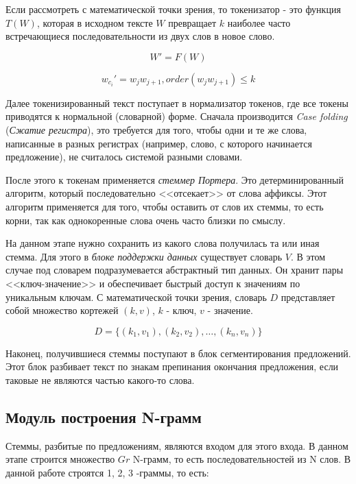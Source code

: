 \documentclass[a4paper,12pt,preview]{report} %
\begin{document}
	Если рассмотреть с математической точки зрения, то токенизатор - это функция $T(W)$, которая в исходном тексте $W$ превращает $k$ наиболее часто встречающиеся последовательности из двух слов в новое слово.
	
	\begin{equation}
	W' = F(W)
	\end{equation}
	
	\begin{equation}
	w_{c_i}' = w_jw_{j+1}, order(w_jw_{j+1}) \leq k 
	\end{equation}
	
	Далее токенизированный текст поступает в нормализатор токенов, где все токены приводятся к нормальной (словарной) форме. Сначала производится \textit{Case folding} (\textit{Сжатие регистра}), это требуется для того, чтобы одни и те же слова, написанные в разных регистрах (например, слово, с которого начинается предложение), не считалось системой разными словами. 
	
	После этого к токенам применяется \textit{стеммер Портера}. Это детерминированный алгоритм, который последовательно <<отсекает>> от слова аффиксы. Этот алгоритм применяется для того, чтобы оставить от слов их стеммы, то есть корни, так как однокоренные слова очень часто близки по смыслу.
	
	На данном этапе нужно сохранить из какого слова получилась та или иная стемма. Для этого в \textit{блоке поддержки данных} существует словарь $V$. В этом случае под словарем подразумевается абстрактный тип данных. Он хранит пары <<ключ-значение>> и обеспечивает быстрый доступ к значениям по уникальным ключам. С математической точки зрения, словарь $D$ представляет собой множество кортежей $(k, v)$, $k$ - ключ, $v$ - значение.
	
	\begin{equation}
	D = \{(k_1, v_1), (k_2, v_2), \dots, (k_n, v_n)\}
	\end{equation}
	
	Наконец, получившиеся стеммы поступают в блок сегментирования предложений. Этот блок разбивает текст по знакам препинания окончания предложения, если таковые не являются частью какого-то слова.
	
	
	\subsection{Модуль построения N-грамм}
	
	Стеммы, разбитые по предложениям, являются входом для этого входа. В данном этапе строится множество $Gr$ N-грамм, то есть последовательностей из N слов. В данной работе строятся 1, 2, 3 -граммы, то есть:
	
\end{document}
